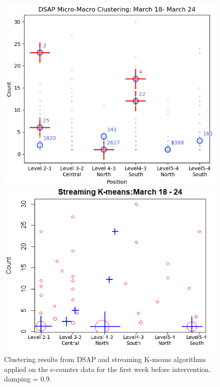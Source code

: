 \begin{figure}[h!] %
\begin{minipage}{0.45\textwidth}
\includegraphics[width=\linewidth]{image/Chapters/Chapter6/beforeInte1week.png}
\end{minipage}
\begin{minipage}{0.45\textwidth}
\includegraphics[width=\linewidth]{image/Chapters/Chapter6/streamKbefore1.png}
\end{minipage}
\caption{Clustering results from DSAP and streaming K-means algorithms applied on the e-counter data for the first week before intervention. damping = 0.9.} \label{fig:b}


\end{figure}
